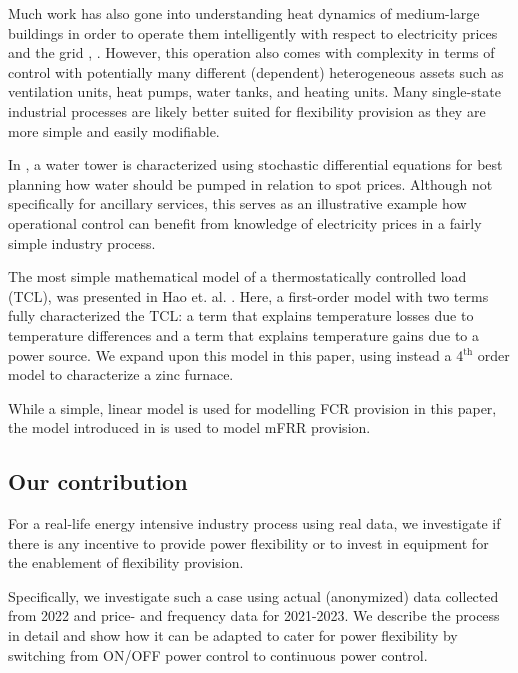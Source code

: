 \documentclass[lettersize,journal]{IEEEtran}
\begin{document}
Much work has also gone into understanding heat dynamics of medium-large buildings \cite{thilker2021non} in order to operate them intelligently with respect to electricity prices and the grid \cite{contreras2018tractable}, \cite{finck2018quantifying}. However, this operation also comes with complexity in terms of control with potentially many different (dependent) heterogeneous assets such as ventilation units, heat pumps, water tanks, and heating units. Many single-state industrial processes are likely better suited for flexibility provision as they are more simple and easily modifiable.

In \cite{junker2020stochastic}, a water tower is characterized using stochastic differential equations for best planning how water should be pumped in relation to spot prices. Although not specifically for ancillary services, this serves as an illustrative example how operational control can benefit from knowledge of electricity prices in a fairly simple industry process.

The most simple mathematical model of a thermostatically controlled load (TCL), was presented in Hao et. al. \cite{hao2014aggregate}. Here, a first-order model with two terms fully characterized the TCL: a term that explains temperature losses due to temperature differences and a term that explains temperature gains due to a power source. We expand upon this model in this paper, using instead a 4$^{\text{th}}$ order model to characterize a zinc furnace.

While a simple, linear model is used for modelling FCR provision in this paper, the model introduced in \cite{gade2023load} is used to model mFRR provision.



\subsection{Our contribution}

For a real-life energy intensive industry process using real data, we investigate if there is any incentive to provide power flexibility or to invest in equipment for the enablement of flexibility provision.

Specifically, we investigate such a case using actual (anonymized) data collected from 2022 and price- and frequency data for 2021-2023. We describe the process in detail and show how it can be adapted to cater for power flexibility by switching from ON/OFF power control to continuous power control.
\end{document}
